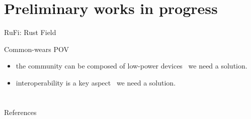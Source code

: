 \documentclass[presentation, 9pt, aspectratio=169]{beamer}\mode<presentation>{\usetheme{AMSBolognaFC}}
\begin{document}
\section{Preliminary works in progress}
\begin{frame}{RuFi: Rust Field}
\begin{alertblock}{Common-wears POV}
	\begin{itemize}
		\item the community can be composed of low-power devices \faArrowRight \, we need a  solution.
		\item interoperability is a key aspect \faArrowRight \, we need a  solution.
	\end{itemize}
\end{alertblock}
\end{frame}
\section{}


\frame{\titlepage}

\section*{\refname}



\begin{frame}[allowframebreaks]{References}
\def\bibfont{\footnotesize}
\printbibliography
\end{frame}

\end{document}
